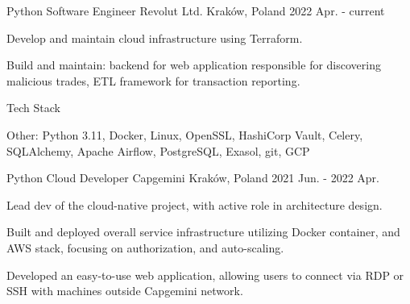 

\begin{cventries}

  \cventry
    {Python Software Engineer} %
    {Revolut Ltd.} %
    {Kraków, Poland} %
    {2022 Apr. - current} %
    {
      \begin{cvitems} %
        \item {Develop and maintain cloud infrastructure using Terraform.}
        \item {Build and maintain: backend for web application responsible for discovering malicious trades, ETL framework for transaction reporting.}
      \end{cvitems}
    }

  \cventry
    {Tech Stack} %
    {}
    {}
    {}
    {
      \begin{cvitems}
        \item {Other: Python 3.11, Docker, Linux, OpenSSL, HashiCorp Vault, Celery, SQLAlchemy, Apache Airflow, PostgreSQL, Exasol, git, GCP}
      \end{cvitems}
    }

  \cventry
    {Python Cloud Developer} %
    {Capgemini} %
    {Kraków, Poland} %
    {2021 Jun. - 2022 Apr.} %
    {
      \begin{cvitems} %
        \item {Lead dev of the cloud-native project, with active role in architecture design.}
        \item {Built and deployed overall service infrastructure utilizing Docker container, and AWS stack, focusing on authorization, and auto-scaling.}
        \item {Developed an easy-to-use web application, allowing users to connect via RDP or SSH with machines outside Capgemini network.}
      \end{cvitems}
    }


\end{cventries}
